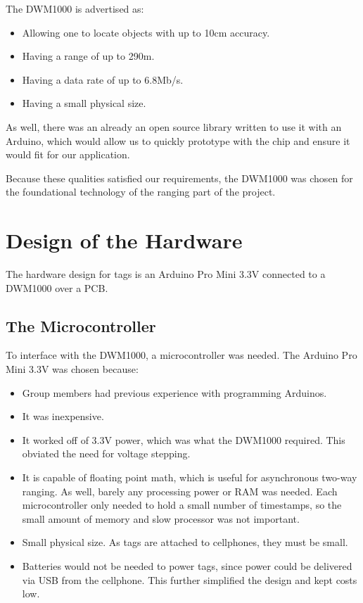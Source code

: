 The DWM1000 is advertised as:
\begin{itemize}
	\item Allowing one to locate objects with up to 10cm accuracy.
	\item Having a range of up to 290m.
	\item Having a data rate of up to 6.8Mb/s.
	\item Having a small physical size. 
\end{itemize}

As well, there was an already an open source library written to use it with an Arduino, which would allow us to quickly prototype with the chip and ensure it would fit for our application.

Because these qualities satisfied our requirements, the DWM1000 was chosen for the foundational technology of the ranging part of the project. 

\section{Design of the Hardware}
The hardware design for tags is an Arduino Pro Mini 3.3V connected to a DWM1000 over a PCB. 

\subsection{The Microcontroller}
To interface with the DWM1000, a microcontroller was needed. The Arduino Pro Mini 3.3V was chosen because:
\begin{itemize}
	\item Group members had previous experience with programming Arduinos.
	\item It was inexpensive.
	\item It worked off of 3.3V power, which was what the DWM1000 required. This obviated the need for voltage stepping.
	\item It is capable of floating point math, which is useful for asynchronous two-way ranging. As well, barely any processing power or RAM was needed. Each microcontroller only needed to hold a small number of timestamps, so the small amount of memory and slow processor was not important.
	\item Small physical size. As tags are attached to cellphones, they must be small.
	\item Batteries would not be needed to power tags, since power could be delivered via USB from the cellphone. This further simplified the design and kept costs low.
\end{itemize}

